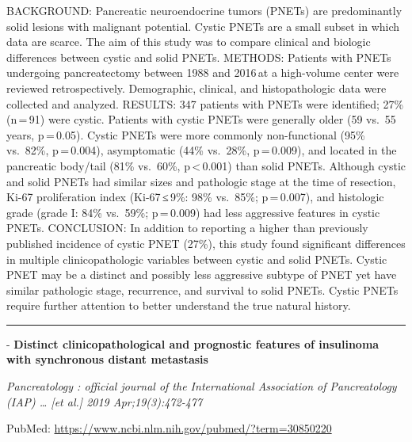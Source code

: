 \documentclass[]{article}
\begin{document}
BACKGROUND: Pancreatic neuroendocrine tumors (PNETs) are predominantly
solid lesions with malignant potential. Cystic PNETs are a small subset
in which data are scarce. The aim of this study was to compare clinical
and biologic differences between cystic and solid PNETs. METHODS:
Patients with PNETs undergoing pancreatectomy between 1988 and 2016\,at
a high-volume center were reviewed retrospectively. Demographic,
clinical, and histopathologic data were collected and analyzed. RESULTS:
347 patients with PNETs were identified; 27\% (n\,=\,91) were cystic.
Patients with cystic PNETs were generally older (59 vs.~55 years,
p\,=\,0.05). Cystic PNETs were more commonly non-functional (95\%
vs.~82\%, p\,=\,0.004), asymptomatic (44\% vs.~28\%, p\,=\,0.009), and
located in the pancreatic body/tail (81\% vs.~60\%,
p\,\textless{}\,0.001) than solid PNETs. Although cystic and solid PNETs
had similar sizes and pathologic stage at the time of resection, Ki-67
proliferation index (Ki-67\,≤\,9\%: 98\% vs.~85\%; p\,=\,0.007), and
histologic grade (grade I: 84\% vs.~59\%; p\,=\,0.009) had less
aggressive features in cystic PNETs. CONCLUSION: In addition to
reporting a higher than previously published incidence of cystic PNET
(27\%), this study found significant differences in multiple
clinicopathologic variables between cystic and solid PNETs. Cystic PNET
may be a distinct and possibly less aggressive subtype of PNET yet have
similar pathologic stage, recurrence, and survival to solid PNETs.
Cystic PNETs require further attention to better understand the true
natural history.

{}

{}

\begin{center}\rule{0.5\linewidth}{\linethickness}\end{center}

 - \textbf{Distinct clinicopathological and prognostic features of
insulinoma with synchronous distant metastasis}

\emph{Pancreatology : official journal of the International Association
of Pancreatology (IAP) \ldots{} {[}et al.{]} 2019 Apr;19(3):472-477}

PubMed: \url{https://www.ncbi.nlm.nih.gov/pubmed/?term=30850220}
\end{document}
